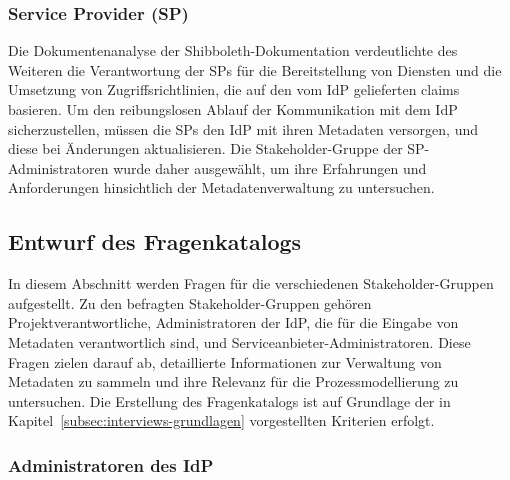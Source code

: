 \documentclass[a4paper, fontsize=11pt]{scrartcl}
\begin{document}
\subsubsection{Service Provider (SP)}
Die Dokumentenanalyse der Shibboleth-Dokumentation verdeutlichte des Weiteren die Verantwortung der SPs für die Bereitstellung von Diensten und die Umsetzung von Zugriffsrichtlinien, die auf den vom IdP gelieferten claims basieren.
Um den reibungslosen Ablauf der Kommunikation mit dem IdP sicherzustellen, müssen die SPs den IdP mit ihren Metadaten versorgen, und diese bei Änderungen aktualisieren.
Die Stakeholder-Gruppe der SP-Administratoren wurde daher ausgewählt, um ihre Erfahrungen und Anforderungen hinsichtlich der Metadatenverwaltung zu untersuchen.

\subsection{Entwurf des Fragenkatalogs}\label{subsubsec:entwurf-fragenkatalog}

In diesem Abschnitt werden Fragen für die verschiedenen Stakeholder-Gruppen aufgestellt.
Zu den befragten Stakeholder-Gruppen gehören Projektverantwortliche, Administratoren der IdP, die für die Eingabe von Metadaten verantwortlich sind, und Serviceanbieter-Administratoren.
Diese Fragen zielen darauf ab, detaillierte Informationen zur Verwaltung von Metadaten zu sammeln und ihre Relevanz für die Prozessmodellierung zu untersuchen.
Die Erstellung des Fragenkatalogs ist auf Grundlage der in Kapitel~\ref{subsec:interviews-grundlagen} vorgestellten Kriterien erfolgt.

\subsubsection{Administratoren des IdP}
\end{document}
